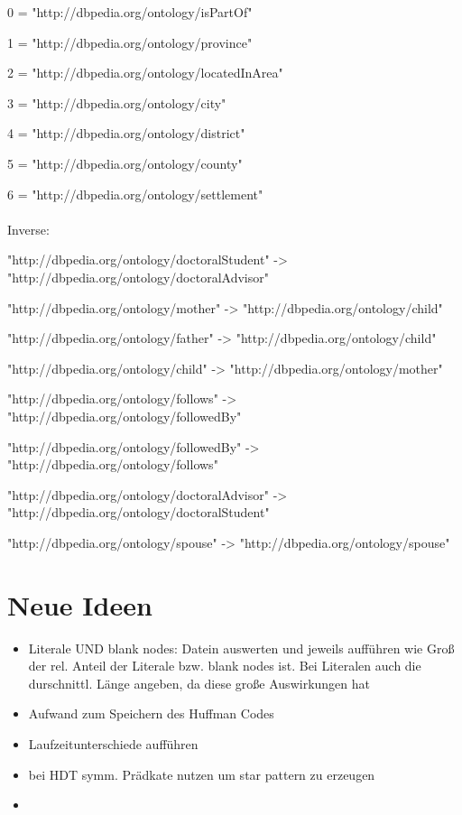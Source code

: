 \documentclass[a4paper]{scrartcl}
\begin{document}
0 = "http://dbpedia.org/ontology/isPartOf"

1 = "http://dbpedia.org/ontology/province"

2 = "http://dbpedia.org/ontology/locatedInArea"

3 = "http://dbpedia.org/ontology/city"

4 = "http://dbpedia.org/ontology/district"

5 = "http://dbpedia.org/ontology/county"

6 = "http://dbpedia.org/ontology/settlement"
\\\\
Inverse:

"http://dbpedia.org/ontology/doctoralStudent" -> "http://dbpedia.org/ontology/doctoralAdvisor"

"http://dbpedia.org/ontology/mother" -> "http://dbpedia.org/ontology/child"

"http://dbpedia.org/ontology/father" -> "http://dbpedia.org/ontology/child"

 "http://dbpedia.org/ontology/child" -> "http://dbpedia.org/ontology/mother"
 
 "http://dbpedia.org/ontology/follows" -> "http://dbpedia.org/ontology/followedBy"
 
 "http://dbpedia.org/ontology/followedBy" -> "http://dbpedia.org/ontology/follows"
 
 "http://dbpedia.org/ontology/doctoralAdvisor" -> "http://dbpedia.org/ontology/doctoralStudent"
 
 "http://dbpedia.org/ontology/spouse" -> "http://dbpedia.org/ontology/spouse"



\section{Neue Ideen}
\begin{itemize}
	\item Literale UND blank nodes: Datein auswerten und jeweils aufführen wie Groß der rel. Anteil der Literale bzw. blank nodes ist. Bei Literalen auch die durschnittl. Länge angeben, da diese große Auswirkungen hat
	\item Aufwand zum Speichern des Huffman Codes
	\item Laufzeitunterschiede aufführen
	
	\item bei HDT symm. Prädkate nutzen um star pattern zu erzeugen
	\item 
\end{itemize}
\end{document}
